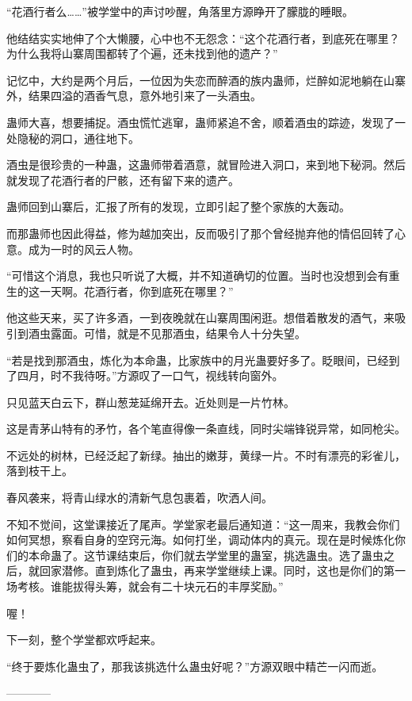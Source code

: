 \begin{this_body}
“花酒行者么……”被学堂中的声讨吵醒，角落里方源睁开了朦胧的睡眼。

他结结实实地伸了个大懒腰，心中也不无怨念：“这个花酒行者，到底死在哪里？为什么我将山寨周围都转了个遍，还未找到他的遗产？”

记忆中，大约是两个月后，一位因为失恋而醉酒的族内蛊师，烂醉如泥地躺在山寨外，结果四溢的酒香气息，意外地引来了一头酒虫。

蛊师大喜，想要捕捉。酒虫慌忙逃窜，蛊师紧追不舍，顺着酒虫的踪迹，发现了一处隐秘的洞口，通往地下。

酒虫是很珍贵的一种蛊，这蛊师带着酒意，就冒险进入洞口，来到地下秘洞。然后就发现了花酒行者的尸骸，还有留下来的遗产。

蛊师回到山寨后，汇报了所有的发现，立即引起了整个家族的大轰动。

而那蛊师也因此得益，修为越加突出，反而吸引了那个曾经抛弃他的情侣回转了心意。成为一时的风云人物。

“可惜这个消息，我也只听说了大概，并不知道确切的位置。当时也没想到会有重生的这一天啊。花酒行者，你到底死在哪里？”

他这些天来，买了许多酒，一到夜晚就在山寨周围闲逛。想借着散发的酒气，来吸引到酒虫露面。可惜，就是不见那酒虫，结果令人十分失望。

“若是找到那酒虫，炼化为本命蛊，比家族中的月光蛊要好多了。眨眼间，已经到了四月，时不我待呀。”方源叹了一口气，视线转向窗外。

只见蓝天白云下，群山葱茏延绵开去。近处则是一片竹林。

这是青茅山特有的矛竹，各个笔直得像一条直线，同时尖端锋锐异常，如同枪尖。

不远处的树林，已经泛起了新绿。抽出的嫩芽，黄绿一片。不时有漂亮的彩雀儿，落到枝干上。

春风袭来，将青山绿水的清新气息包裹着，吹洒人间。

不知不觉间，这堂课接近了尾声。学堂家老最后通知道：“这一周来，我教会你们如何冥想，察看自身的空窍元海。如何打坐，调动体内的真元。现在是时候炼化你们的本命蛊了。这节课结束后，你们就去学堂里的蛊室，挑选蛊虫。选了蛊虫之后，就回家潜修。直到炼化了蛊虫，再来学堂继续上课。同时，这也是你们的第一场考核。谁能拔得头筹，就会有二十块元石的丰厚奖励。”

喔！

下一刻，整个学堂都欢呼起来。

“终于要炼化蛊虫了，那我该挑选什么蛊虫好呢？”方源双眼中精芒一闪而逝。

------------

\end{this_body}

